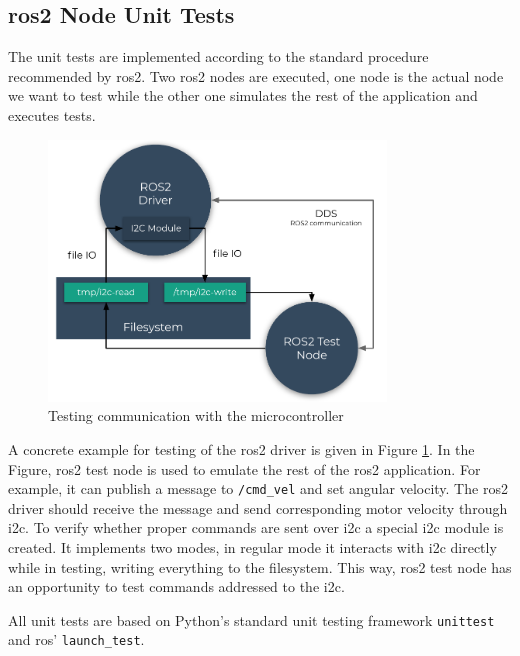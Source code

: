 \subsection{\ac{ros2} Node Unit Tests}

The unit tests are implemented according to the standard procedure recommended by \ac{ros2}. Two \ac{ros2} nodes are executed, one node is the actual node we want to test while the other one simulates the rest of the application and executes tests. 

\begin{figure}[H]
    \centering
    \includegraphics[width=0.8\textwidth]{physical/figures/mocking.pdf}
    \caption{Testing communication with the microcontroller}
    \label{fig:physical:mocking}
\end{figure}

A concrete example for testing of the \ac{ros2} driver is given in Figure \ref{fig:physical:mocking}. In the Figure, \ac{ros2} test node is used to emulate the rest of the \ac{ros2} application. For example, it can publish a message to \texttt{/cmd\_vel} and set angular velocity.
The \ac{ros2} driver should receive the message and send corresponding motor velocity through \ac{i2c}. To verify whether proper commands are sent over \ac{i2c} a special \ac{i2c} module is created.
It implements two modes, in regular mode it interacts with \ac{i2c} directly while in testing, writing everything to the filesystem. 
This way, \ac{ros2} test node has an opportunity to test commands addressed to the \ac{i2c}.

All unit tests are based on Python's standard unit testing framework \texttt{unittest} and \ac{ros}' \texttt{launch\_test}.

